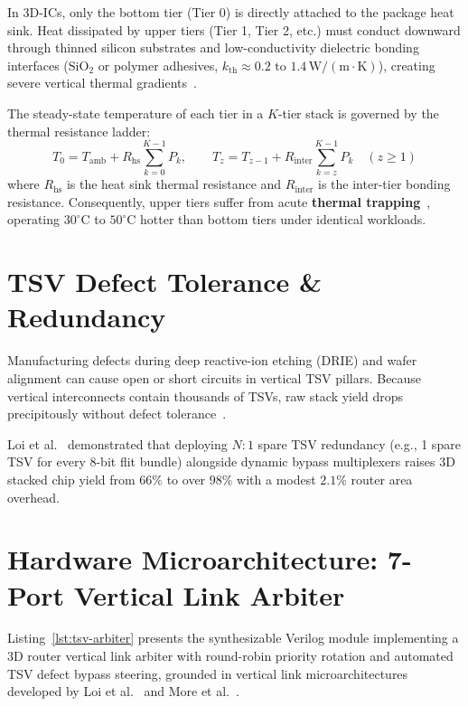In 3D-ICs, only the bottom tier (Tier 0) is directly attached to the package heat sink. Heat dissipated by upper tiers (Tier 1, Tier 2, etc.) must conduct downward through thinned silicon substrates and low-conductivity dielectric bonding interfaces ($\mathrm{SiO_2}$ or polymer adhesives, $k_{\mathrm{th}} \approx 0.2\text{ to }1.4\,\mathrm{W/(m\cdot K)}$), creating severe vertical thermal gradients~\cite{Skadron2003,Huang2006,Chao2013}.

The steady-state temperature of each tier in a $K$-tier stack is governed by the thermal resistance ladder:
\begin{equation}
    T_0 = T_{\mathrm{amb}} + R_{\mathrm{hs}} \sum_{k=0}^{K-1} P_k, \qquad T_z = T_{z-1} + R_{\mathrm{inter}} \sum_{k=z}^{K-1} P_k \quad (z \ge 1)
    \label{eq:thermal-stacking-ladder}
\end{equation}
where $R_{\mathrm{hs}}$ is the heat sink thermal resistance and $R_{\mathrm{inter}}$ is the inter-tier bonding resistance. Consequently, upper tiers suffer from acute \textbf{thermal trapping}~\cite{Chao2013}, operating $30^\circ\mathrm{C}$ to $50^\circ\mathrm{C}$ hotter than bottom tiers under identical workloads.

\section{TSV Defect Tolerance \& Redundancy}
\label{sec:tsv-defect-tolerance}

Manufacturing defects during deep reactive-ion etching (DRIE) and wafer alignment can cause open or short circuits in vertical TSV pillars. Because vertical interconnects contain thousands of TSVs, raw stack yield drops precipitously without defect tolerance~\cite{Seiculescu2010}.

Loi et al.~\cite{Loi2011} demonstrated that deploying $N:1$ spare TSV redundancy (e.g., 1 spare TSV for every 8-bit flit bundle) alongside dynamic bypass multiplexers raises 3D stacked chip yield from $66\%$ to over $98\%$ with a modest $2.1\%$ router area overhead.

\section{Hardware Microarchitecture: 7-Port Vertical Link Arbiter}
\label{sec:tsv-arbiter-rtl}

Listing~\ref{lst:tsv-arbiter} presents the synthesizable Verilog module implementing a 3D router vertical link arbiter with round-robin priority rotation and automated TSV defect bypass steering, grounded in vertical link microarchitectures developed by Loi et al.~\cite{Loi2011} and More et al.~\cite{More2018}.

